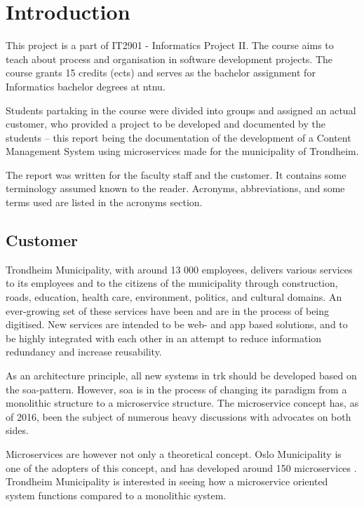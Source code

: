 \chapter{Introduction}
\label{chapterIntroduction}

This project is a part of IT2901 - Informatics Project II. The course aims to teach about process and organisation in software development projects. The course grants 15 credits (\acrshort{ects}) and serves as the bachelor assignment for Informatics bachelor degrees at \acrshort{ntnu}.

Students partaking in the course were divided into groups and assigned an actual customer, who provided a project to be developed and documented by the students -- this report being the documentation of the development of a Content Management System using microservices made for the municipality of Trondheim.

The report was written for the faculty staff and the customer. It contains some terminology assumed known to the reader. Acronyms, abbreviations, and some terms used are listed in the acronyms section.

\section{Customer} \label{section:introductionCustomer}
Trondheim Municipality, with around 13 000 employees, delivers various services to its employees and to the citizens of the municipality through construction, roads, education, health care, environment, politics, and cultural domains. An ever-growing set of these services have been and are in the process of being digitised. New services are intended to be web- and app based solutions, and to be highly integrated with each other in an attempt to reduce information redundancy and increase reusability.

As an architecture principle, all new systems in \acrshort{trk} should be developed based on the \acrshort{soa}-pattern.
However, \acrshort{soa} is in the process of changing its paradigm from a monolithic structure to a microservice structure.
The microservice concept has, as of 2016, been the subject of numerous heavy discussions with advocates on both sides. %

Microservices are however not only a theoretical concept. Oslo Municipality is one of the adopters of this concept, and has developed around 150 microservices \citep{osloMicroservices}. Trondheim Municipality is interested in seeing how a microservice oriented system functions compared to a monolithic system.


